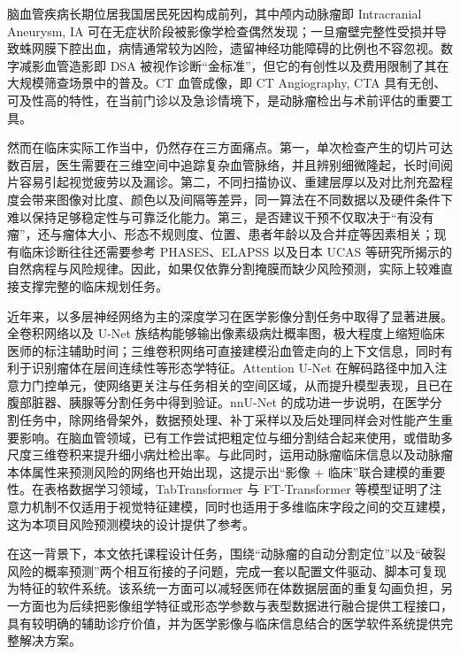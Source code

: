 
脑血管疾病长期位居我国居民死因构成前列，其中颅内动脉瘤即 Intracranial Aneurysm, IA 可在无症状阶段被影像学检查偶然发现；一旦瘤壁完整性受损并导致蛛网膜下腔出血，病情通常较为凶险，遗留神经功能障碍的比例也不容忽视。数字减影血管造影即 DSA 被视作诊断“金标准”，但它的有创性以及费用限制了其在大规模筛查场景中的普及。CT 血管成像，即 CT Angiography, CTA 具有无创、可及性高的特性，在当前门诊以及急诊情境下，是动脉瘤检出与术前评估的重要工具\cite{chen2021,ou2022}。

然而在临床实际工作当中，仍然存在三方面痛点。第一，单次检查产生的切片可达数百层，医生需要在三维空间中追踪复杂血管脉络，并且辨别细微隆起，长时间阅片容易引起视觉疲劳以及漏诊。第二，不同扫描协议、重建层厚以及对比剂充盈程度会带来图像对比度、颜色以及间隔等差异，同一算法在不同数据以及硬件条件下难以保持足够稳定性与可靠泛化能力。第三，是否建议干预不仅取决于“有没有瘤”，还与瘤体大小、形态不规则度、位置、患者年龄以及合并症等因素相关；现有临床诊断往往还需要参考 PHASES、ELAPSS 以及日本 UCAS 等研究所揭示的自然病程与风险规律\cite{greving2014,backes2017,morita2012,thompson2015}。因此，如果仅依靠分割掩膜而缺少风险预测，实际上较难直接支撑完整的临床规划任务。

近年来，以多层神经网络为主的深度学习在医学影像分割任务中取得了显著进展。全卷积网络以及 U-Net 族结构能够输出像素级病灶概率图，极大程度上缩短临床医师的标注辅助时间\cite{unet,long2015}；三维卷积网络可直接建模沿血管走向的上下文信息，同时有利于识别瘤体在层间连续性等形态学特征\cite{unet3d,milletari2016}。Attention U-Net 在解码路径中加入注意力门控单元，使网络更关注与任务相关的空间区域，从而提升模型表现，且已在腹部脏器、胰腺等分割任务中得到验证\cite{attention_unet}。nnU-Net 的成功进一步说明，在医学分割任务中，除网络骨架外，数据预处理、补丁采样以及后处理同样会对性能产生重要影响\cite{nnunet}。在脑血管领域，已有工作尝试把粗定位与细分割结合起来使用，或借助多尺度三维卷积来提升细小病灶检出率\cite{kamnitsas2017,chen2021,ou2022}。与此同时，运用动脉瘤临床信息以及动脉瘤本体属性来预测风险的网络也开始出现，这提示出“影像 + 临床”联合建模的重要性\cite{strokenet,xiong2025}。在表格数据学习领域，TabTransformer 与 FT-Transformer 等模型证明了注意力机制不仅适用于视觉特征建模，同时也适用于多维临床字段之间的交互建模，这为本项目风险预测模块的设计提供了参考\cite{tabtransformer2020,fttransformer2021}。

在这一背景下，本文依托课程设计任务，围绕“动脉瘤的自动分割定位”以及“破裂风险的概率预测”两个相互衔接的子问题，完成一套以配置文件驱动、脚本可复现为特征的软件系统。该系统一方面可以减轻医师在体数据层面的重复勾画负担，另一方面也为后续把影像组学特征或形态学参数与表型数据进行融合提供工程接口，具有较明确的辅助诊疗价值，并为医学影像与临床信息结合的医学软件系统提供完整解决方案。

